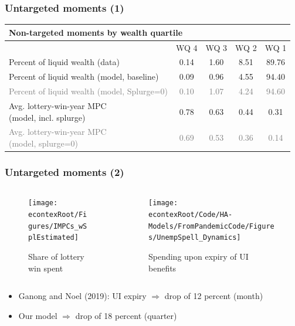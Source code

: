 \documentclass[pdflatex,aspectratio=169, handout]{beamer}
\begin{document}
{\begin{frame}
            \end{frame}
            
          }{}


\begin{frame}
\frametitle{Untargeted moments (1)}
\begin{tabular}{lcccc}
	\multicolumn{5}{l}{Non-targeted moments by wealth quartile} \\ \midrule
	& WQ 4 & WQ 3 & WQ 2 & WQ 1 \\ \midrule
	Percent of liquid wealth (data) & 0.14 & 1.60 & 8.51 & 89.76 \\
	Percent of liquid wealth (model, baseline) & 0.09 & 0.96 & 4.55 & 94.40 \\
	\textcolor{gray}{Percent of liquid wealth (model, Splurge=0)} & \textcolor{gray}{0.10} & \textcolor{gray}{1.07} & \textcolor{gray}{4.24} & \textcolor{gray}{94.60} \\
	\makecell[l]{Avg. lottery-win-year MPC \\ (model, incl. splurge)} & 0.78 & 0.63 & 0.44 & 0.31 \\
	\makecell[l]{\textcolor{gray}{Avg. lottery-win-year MPC} \\ \textcolor{gray}{(model, splurge=0)}} & \textcolor{gray}{0.69} & \textcolor{gray}{0.53} & \textcolor{gray}{0.36} & \textcolor{gray}{0.14}
	\\ \bottomrule 
\end{tabular}
\end{frame}

\begin{frame}
\frametitle{Untargeted moments (2)}
\begin{columns}
	\begin{column}{0.50\textwidth}
		\begin{figure}
			\texttt{[image: \\econtexRoot/Figures/IMPCs\_wSplEstimated]}
			\caption{Share of lottery win spent}
		\end{figure}
	\end{column}
	\begin{column}{0.50\textwidth}
		\begin{figure}
			\texttt{[image: \\econtexRoot/Code/HA-Models/FromPandemicCode/Figures/UnempSpell\_Dynamics]}
			\caption{Spending upon expiry of UI benefits}
		\end{figure}
	\end{column}
\end{columns}
\begin{itemize}
	\item Ganong and Noel (2019): UI expiry $\Rightarrow$ drop of 12 percent (month)
	\item Our model $\Rightarrow$ drop of 18 percent (quarter) 
\end{itemize}
\end{frame}
\end{document}
